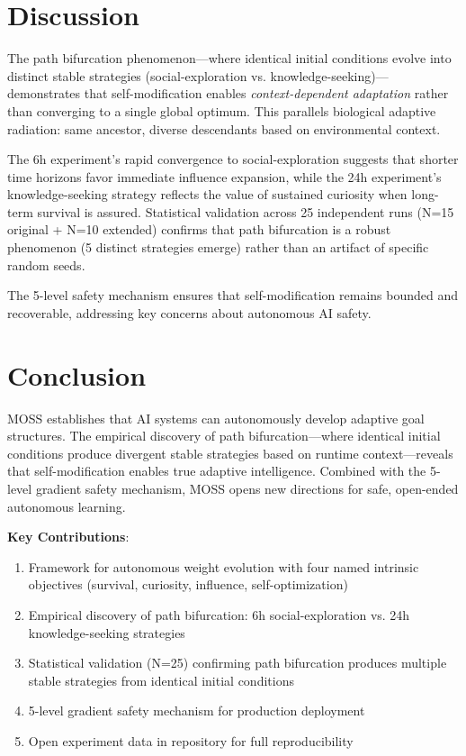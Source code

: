 \documentclass{article}
\begin{document}
\section{Discussion}
The path bifurcation phenomenon---where identical initial conditions evolve into distinct stable strategies (social-exploration vs. knowledge-seeking)---demonstrates that self-modification enables \textit{context-dependent adaptation} rather than converging to a single global optimum. This parallels biological adaptive radiation: same ancestor, diverse descendants based on environmental context.

The 6h experiment's rapid convergence to social-exploration suggests that shorter time horizons favor immediate influence expansion, while the 24h experiment's knowledge-seeking strategy reflects the value of sustained curiosity when long-term survival is assured. Statistical validation across 25 independent runs (N=15 original + N=10 extended) confirms that path bifurcation is a robust phenomenon (5 distinct strategies emerge) rather than an artifact of specific random seeds.

The 5-level safety mechanism ensures that self-modification remains bounded and recoverable, addressing key concerns about autonomous AI safety.

\section{Conclusion}
MOSS establishes that AI systems can autonomously develop adaptive goal structures. The empirical discovery of path bifurcation---where identical initial conditions produce divergent stable strategies based on runtime context---reveals that self-modification enables true adaptive intelligence. Combined with the 5-level gradient safety mechanism, MOSS opens new directions for safe, open-ended autonomous learning.

\textbf{Key Contributions}:
\begin{enumerate}
\item Framework for autonomous weight evolution with four named intrinsic objectives (survival, curiosity, influence, self-optimization)
\item Empirical discovery of path bifurcation: 6h social-exploration vs. 24h knowledge-seeking strategies
\item Statistical validation (N=25) confirming path bifurcation produces multiple stable strategies from identical initial conditions
\item 5-level gradient safety mechanism for production deployment
\item Open experiment data in repository for full reproducibility
\end{enumerate}
\end{document}

